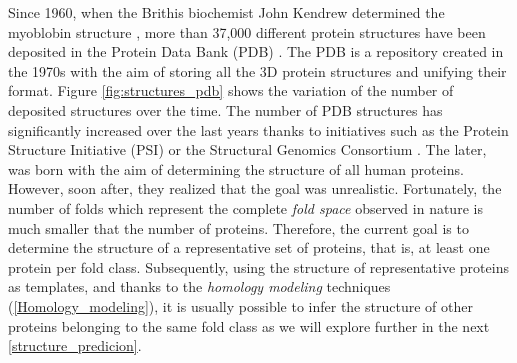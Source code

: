 \documentclass[11pt, b5paper,twoside]{tesi_upf}
\begin{document}
\par Since 1960, when the Brithis biochemist John Kendrew determined the myoblobin structure \cite{KENDREW1960}, more than 37,000 different protein structures have been deposited in the Protein Data Bank (PDB) \cite{Berman2000}. The PDB is a repository created in the 1970s with the aim of storing all the 3D protein structures and unifying their format. Figure \ref{fig:structures_pdb} shows the variation of the number of deposited structures over the time. The number of PDB structures has significantly increased over the last years thanks to initiatives such as the Protein Structure Initiative (PSI) \cite{Norvell2007} or the Structural Genomics Consortium \cite{GIleadi2007}. The later, was born with the aim of determining the structure of all human proteins. However, soon after, they realized that the goal was unrealistic. Fortunately, the number of folds which represent the complete \textit{fold space} observed in nature is much smaller that the number of proteins. Therefore, the current goal is to determine the structure of a representative set of proteins, that is, at least one protein per fold class. Subsequently, using the structure of representative proteins as templates, and thanks to the \textit{homology modeling} techniques (\cref{Homology_modeling}), it is usually possible to infer the structure of other proteins belonging to the same fold class as we will explore further in the next \cref{structure_predicion}.
\end{document}

